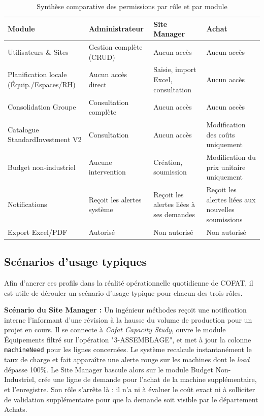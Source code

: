 \begin{table}[h]
\centering
\begin{tabular}{|p{3.4cm}|p{3.4cm}|p{3.4cm}|p{3.4cm}|}
\hline
\textbf{Module} & \textbf{Administrateur} & \textbf{Site Manager} & \textbf{Achat} \\ \hline
Utilisateurs \& Sites & Gestion complète (CRUD) & Aucun accès & Aucun accès \\ \hline
Planification locale (Équip./Espaces/RH) & Aucun accès direct & Saisie, import Excel, consultation & Aucun accès \\ \hline
Consolidation Groupe & Consultation complète & Aucun accès & Aucun accès \\ \hline
Catalogue StandardInvestment V2 & Consultation & Aucun accès & Modification des coûts uniquement \\ \hline
Budget non-industriel & Aucune intervention & Création, soumission & Modification du prix unitaire uniquement \\ \hline
Notifications & Reçoit les alertes système & Reçoit les alertes liées à ses demandes & Reçoit les alertes liées aux nouvelles soumissions \\ \hline
Export Excel/PDF & Autorisé & Non autorisé & Non autorisé \\ \hline
\end{tabular}
\caption{Synthèse comparative des permissions par rôle et par module}
\label{tab:synthese_roles}
\end{table}



\subsection{Scénarios d'usage typiques}
Afin d'ancrer ces profils dans la réalité opérationnelle quotidienne de COFAT, il est utile de dérouler un scénario d'usage typique pour chacun des trois rôles.

\textbf{Scénario du Site Manager :} Un ingénieur méthodes reçoit une notification interne l'informant d'une révision à la hausse du volume de production pour un projet en cours. Il se connecte à \textit{Cofat Capacity Study}, ouvre le module Équipements filtré sur l'opération "3-ASSEMBLAGE", et met à jour la colonne \texttt{machineNeed} pour les lignes concernées. Le système recalcule instantanément le taux de charge et fait apparaître une alerte rouge sur les machines dont le \textit{load} dépasse 100\%. Le Site Manager bascule alors sur le module Budget Non-Industriel, crée une ligne de demande pour l'achat de la machine supplémentaire, et l'enregistre. Son rôle s'arrête là : il n'a ni à évaluer le coût exact ni à solliciter de validation supplémentaire pour que la demande soit visible par le département Achats.

